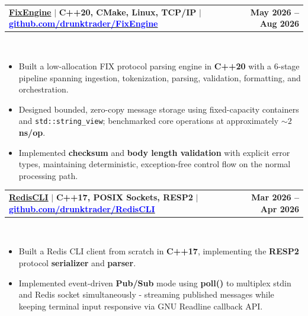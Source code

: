 \documentclass[letterpaper,10pt]{article}
\makeatletter
\newcommand{\resumeItem}[1]{
  \item\small{
    {#1 \vspace{-5pt}}
  }
}
\newcommand{\resumeProjectHeading}[2]{
    \item
    \begin{tabular*}{1.001\textwidth}{l@{\extracolsep{\fill}}r}
      \small#1 & \textbf{\small #2}\\
    \end{tabular*}\vspace{-12pt}
}
\newcommand{\resumeItemListStart}{\begin{itemize}}
\newcommand{\resumeItemListEnd}{\end{itemize}\vspace{-5pt}}
\makeatother
\begin{document}
    \resumeProjectHeading
    {\textbf{\normalsize\underline{FixEngine}} $|$ \footnotesize{\textbf{C++20, CMake, Linux, TCP/IP}} $|$ \href{https://github.com/DrunkTrader/FixEngine}{\textcolor{blue}{\textbf{github.com/drunktrader/FixEngine}}}}{May 2026 -- Aug 2026}\\
  \vspace{8pt}
  \resumeItemListStart
      \resumeItem{Built a low-allocation FIX protocol parsing engine in \textbf{C++20} with a 6-stage pipeline spanning ingestion, tokenization, parsing, validation, formatting, and orchestration.}
      \vspace{2pt}
      \resumeItem{Designed bounded, zero-copy message storage using fixed-capacity containers and \texttt{std::string\_view}; benchmarked core operations at approximately \textbf{$\sim2$ ns/op}.}
      \vspace{2pt}
      \resumeItem{Implemented \textbf{checksum} and \textbf{body length validation} with explicit error types, maintaining deterministic, exception-free control flow on the normal processing path.}
      \vspace{2pt}
  \resumeItemListEnd
    \vspace{-6pt}

     \resumeProjectHeading
    {\textbf{\normalsize{\underline{RedisCLI}}} $|$ \footnotesize{\textbf{C++17, POSIX Sockets, RESP2}} $|$ \href{https://github.com/drunktrader/RedisCLI}{\textcolor{blue}{\textbf{github.com/drunktrader/RedisCLI}}}}{Mar 2026 -- Apr 2026}\\
    \vspace{8pt}
    \resumeItemListStart
        \resumeItem{Built a Redis CLI client from scratch in \textbf{C++17}, implementing the \textbf{RESP2} protocol \textbf{serializer} and \textbf{parser}.}
        \vspace{2pt}
        \resumeItem{Implemented event-driven \textbf{Pub/Sub} mode using \textbf{poll()} to multiplex stdin and Redis socket simultaneously - streaming published messages while keeping terminal input responsive via GNU Readline callback API.}
        \vspace{2pt}
    \resumeItemListEnd
    \vspace{-6pt}
\end{document}
